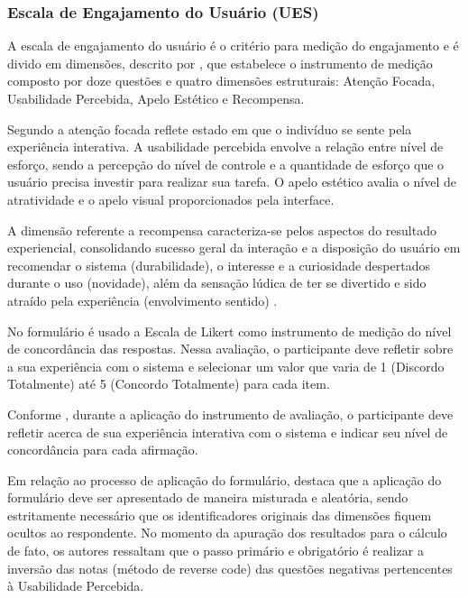 \documentclass{abnt}
\begin{document}
\subsubsection{Escala de Engajamento do Usuário (UES)}
A escala de engajamento do usuário é o critério para medição do engajamento e é
divido em dimensões, descrito por \cite{obrien2018practical}, que estabelece o
instrumento de medição composto por doze questões e quatro dimensões
estruturais: Atenção Focada, Usabilidade Percebida, Apelo Estético e Recompensa.

Segundo \cite{obrien2018practical} a atenção focada reflete estado em que o
indivíduo se sente pela experiência interativa. A usabilidade percebida envolve
a relação entre nível de esforço, sendo a percepção do nível de controle e a
quantidade de esforço que o usuário precisa investir para realizar sua tarefa. O
apelo estético avalia o nível de atratividade e o apelo visual proporcionados
pela interface. 

A dimensão referente a recompensa caracteriza-se pelos aspectos do resultado
experiencial, consolidando sucesso geral da interação e a disposição do usuário
em recomendar o sistema (durabilidade), o interesse e a curiosidade despertados
durante o uso (novidade), além da sensação lúdica de ter se divertido e sido
atraído pela experiência (envolvimento sentido) \cite{obrien2018practical}.

No formulário é usado a Escala de Likert como instrumento de medição do nível de
concordância das respostas. Nessa avaliação, o participante deve refletir sobre
a sua experiência com o sistema e selecionar um valor que varia de 1 (Discordo
Totalmente) até 5 (Concordo Totalmente) para cada item.

Conforme \cite{obrien2018practical}, durante a aplicação do instrumento de
avaliação, o participante deve refletir acerca de sua experiência interativa com
o sistema e indicar seu nível de concordância para cada afirmação.

Em relação ao processo de aplicação do formulário, \cite{obrien2018practical}
destaca que a aplicação do formulário deve ser apresentado de maneira misturada
e aleatória, sendo estritamente necessário que os identificadores originais das
dimensões fiquem ocultos ao respondente. 
\newpage
No momento da apuração dos resultados para o cálculo de fato, os autores
ressaltam que o passo primário e obrigatório é realizar a inversão das notas
(método de reverse code) das questões negativas pertencentes à Usabilidade
Percebida.
\end{document}
